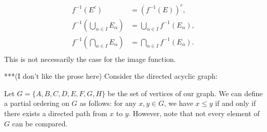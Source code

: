 \begin{example}
            \begin{equation*}
            \begin{split}
                f^{-1}\left( E^c \right) &= \left( f^{-1}(E) \right)^c, \\
                f^{-1}\left( \bigcup_{\alpha \in I}E_\alpha \right) &= \bigcup_{\alpha \in I} f^{-1}(E_\alpha), \\
                f^{-1}\left( \bigcap_{\alpha \in I}E_\alpha \right) &= \bigcap_{\alpha \in I} f^{-1}(E_\alpha).  \\
            \end{split}
            \end{equation*}
        This is not necessarily the case for the image function.
    \end{example}

    \begin{example}***(I don't like the prose here)
        Consider the directed acyclic graph:
            \begin{center}
            \end{center}
        Let $G = \{A,B,C,D,E,F,G,H\}$ be the set of vertices of our graph. We can define a partial ordering on $G$ as follows: for any $x,y \in G$, we have $x \leq y$ if and only if there exists a directed path from $x$ to $y$. However, note that not every element of $G$ can be compared.
    \end{example}

